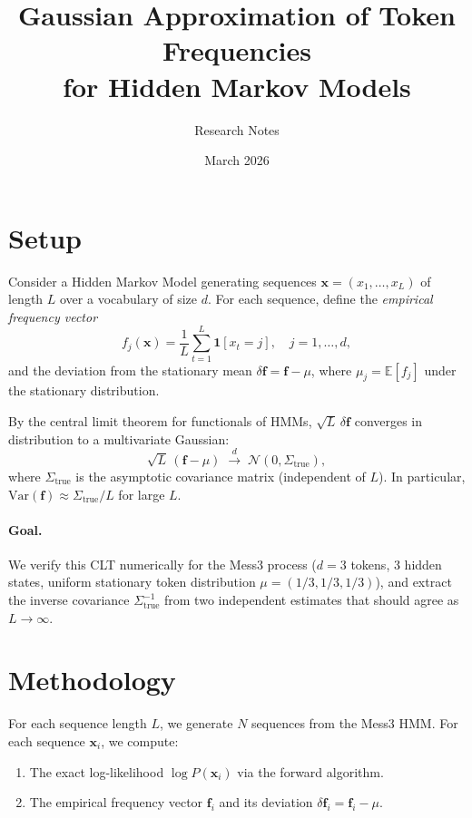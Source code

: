 \documentclass[11pt]{article}
\title{Gaussian Approximation of Token Frequencies\\for Hidden Markov Models}
\author{Research Notes}
\date{March 2026}
\newcommand{\vf}{\mathbf{f}}
\newcommand{\vx}{\mathbf{x}}
\newcommand{\Strue}{\Sigma_{\mathrm{true}}}
\begin{document}
\maketitle

\section{Setup}

Consider a Hidden Markov Model generating sequences $\vx = (x_1, \ldots, x_L)$ of length $L$ over a vocabulary of size $d$. For each sequence, define the \emph{empirical frequency vector}
\begin{equation}
  f_j(\vx) = \frac{1}{L} \sum_{t=1}^{L} \mathbf{1}[x_t = j], \quad j = 1, \ldots, d,
\end{equation}
and the deviation from the stationary mean $\delta\vf = \vf - \mu$, where $\mu_j = \mathbb{E}[f_j]$ under the stationary distribution.

By the central limit theorem for functionals of HMMs, $\sqrt{L}\,\delta\vf$ converges in distribution to a multivariate Gaussian:
\begin{equation}\label{eq:clt}
  \sqrt{L}\,(\vf - \mu) \;\xrightarrow{d}\; \mathcal{N}(0, \Strue),
\end{equation}
where $\Strue$ is the asymptotic covariance matrix (independent of $L$). In particular, $\mathrm{Var}(\vf) \approx \Strue / L$ for large $L$.

\paragraph{Goal.} We verify this CLT numerically for the Mess3 process ($d = 3$ tokens, 3 hidden states, uniform stationary token distribution $\mu = (1/3, 1/3, 1/3)$), and extract the inverse covariance $\Strue^{-1}$ from two independent estimates that should agree as $L \to \infty$.

\section{Methodology}

For each sequence length $L$, we generate $N$ sequences from the Mess3 HMM. For each sequence $\vx_i$, we compute:
\begin{enumerate}
  \item The exact log-likelihood $\log P(\vx_i)$ via the forward algorithm.
  \item The empirical frequency vector $\vf_i$ and its deviation $\delta\vf_i = \vf_i - \mu$.
\end{enumerate}
\end{document}
